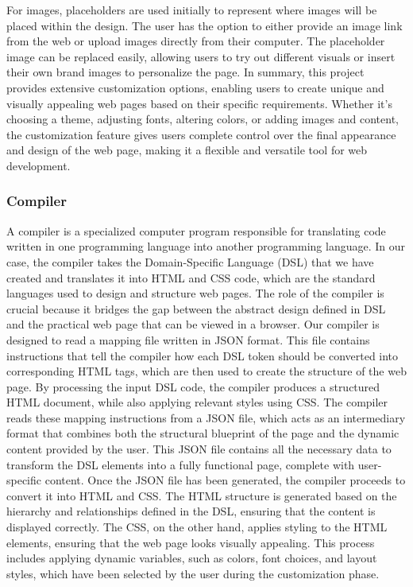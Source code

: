     For images, placeholders are used initially to represent where images will be placed within the design. The user has the option to either provide an image link from the web or upload images directly from their computer. The placeholder image can be replaced easily, allowing users to try out different visuals or insert their own brand images to personalize the page.
    In summary, this project provides extensive customization options, enabling users to create unique and visually appealing web pages based on their specific requirements. Whether it’s choosing a theme, adjusting fonts, altering colors, or adding images and content, the customization feature gives users complete control over the final appearance and design of the web page, making it a flexible and versatile tool for web development.
    
    \subsubsection{Compiler}  
    A compiler is a specialized computer program responsible for translating code written in one programming language into another programming language. In our case, the compiler takes the Domain-Specific Language (DSL) that we have created and translates it into HTML and CSS code, which are the standard languages used to design and structure web pages. 
    The role of the compiler is crucial because it bridges the gap between the abstract design defined in DSL and the practical web page that can be viewed in a browser. Our compiler is designed to read a mapping file written in JSON format. This file contains instructions that tell the compiler how each DSL token should be converted into corresponding HTML tags, which are then used to create the structure of the web page. By processing the input DSL code, the compiler produces a structured HTML document, while also applying relevant styles using CSS.
    The compiler reads these mapping instructions from a JSON file, which acts as an intermediary format that combines both the structural blueprint of the page and the dynamic content provided by the user. This JSON file contains all the necessary data to transform the DSL elements into a fully functional page, complete with user-specific content.
    Once the JSON file has been generated, the compiler proceeds to convert it into HTML and CSS. The HTML structure is generated based on the hierarchy and relationships defined in the DSL, ensuring that the content is displayed correctly. The CSS, on the other hand, applies styling to the HTML elements, ensuring that the web page looks visually appealing. This process includes applying dynamic variables, such as colors, font choices, and layout styles, which have been selected by the user during the customization phase.
